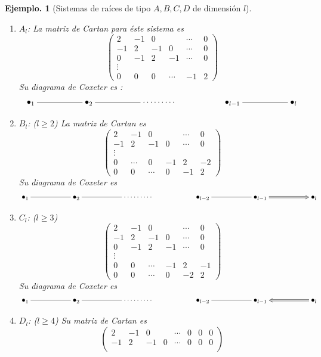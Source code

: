 \documentclass[11pt,a4paper]{article}
\newtheorem{example}{Ejemplo.}
\begin{document}
\begin{example}[Sistemas de raíces de tipo $A,B,C,D$ de dimensión $l$]
 \begin{enumerate}
    \item $A_l$: 
    La matriz de Cartan para éste sistema es 
    $$\begin{pmatrix}2 & -1 & 0 & & \cdots &0 \\
    -1 & 2 & -1 &0 & \cdots & 0 \\
    0 & -1 & 2 &-1 & \cdots &0\\
    \vdots & \\
    0 & 0 &0 & \cdots & -1 & 2\end{pmatrix} $$
    Su diagrama de Coxeter es :
    $$\xymatrix{ \bullet_1\ar@{-}[rr] && \bullet_2\ar@{-}[rr] &&\cdots  \cdots \cdots && \bullet_{l-1}\ar@{-}[rr]    && \bullet_l}$$
    \item $B_l$: ($l\geq 2$)
    La matriz de Cartan es 
   $$\begin{pmatrix}2 & -1 & 0 & & \cdots &0 \\
    -1 & 2 & -1 &0 & \cdots & 0 \\
    \vdots & \\
    0 & \cdots & 0 &-1 & 2 &-2\\
    0 & 0 &\cdots &0  & -1 & 2\end{pmatrix} $$
    Su diagrama de Coxeter es 
    $$\xymatrix{ \bullet_1\ar@{-}[rr] && \bullet_2\ar@{-}[rr] &&\cdots  \cdots \cdots && \bullet_{l-2}\ar@{-}[rr] && \bullet_{l-1}  \ar@{=>}[rr]    && \bullet_l  }$$
    \item $C_l$: ($l\geq 3$)
    $$\begin{pmatrix}2 & -1 & 0 & & \cdots &0 \\
    -1 & 2 & -1 &0 & \cdots & 0 \\
     0 &-1 & 2 &-1 & \cdots & 0\\
    \vdots & \\
    0 &0 & \cdots & -1 & 2 & -1 \\
    0 & 0 &\cdots &0  & -2 & 2\end{pmatrix}$$
    Su diagrama de Coxeter es 
     $$\xymatrix{ \bullet_1\ar@{-}[rr] && \bullet_2\ar@{-}[rr] &&\cdots  \cdots \cdots && \bullet_{l-2}\ar@{-}[rr] && \bullet_{l-1}  \ar@{<=}[rr]    && \bullet_l  }$$
     \item $D_l$: ($l\geq 4$)
     Su matriz de Cartan es
     $$\begin{pmatrix}2 & -1 & 0 & & \cdots &0 &0 &0 \\
    -1 & 2 & -1 &0 & \cdots & 0 & 0 &0\\

\end{pmatrix}$$
\end{enumerate}
\end{example}
\end{document}
